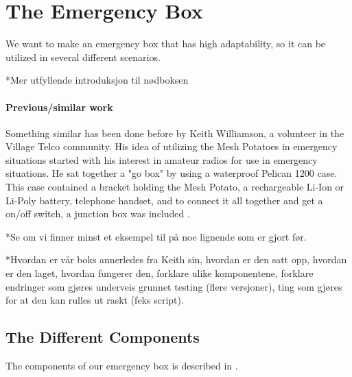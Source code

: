 \section{The Emergency Box}
We want to make an emergency box that has high adaptability, so it can be utilized in several different scenarios. 

*Mer utfyllende introduksjon til nødboksen  

\paragraph{Previous/similar work}
Something similar has been done before by Keith Williamson, a volunteer in the Village Telco community. His idea of utilizing the Mesh Potatoes in emergency situations started with his interest in amateur radios for use in emergency situations. He sat together a "go box" by using a waterproof Pelican 1200 case.  This case contained a bracket holding the Mesh Potato, a rechargeable Li-Ion or Li-Poly battery, telephone handset, and to connect it all together and get a on/off switch, a junction box was included \cite{keith}. 

*Se om vi finner minst et eksempel til på noe lignende som er gjort før. 

*Hvordan er vår boks annerledes fra Keith sin, hvordan er den satt opp, hvordan er den laget, hvordan fungerer den, forklare ulike komponentene, forklare endringer som gjøres underveis grunnet testing (flere versjoner), ting som gjøres for at den kan rulles ut raskt (feks script). 

\subsection{The Different Components}
The components of our emergency box is described in . 

